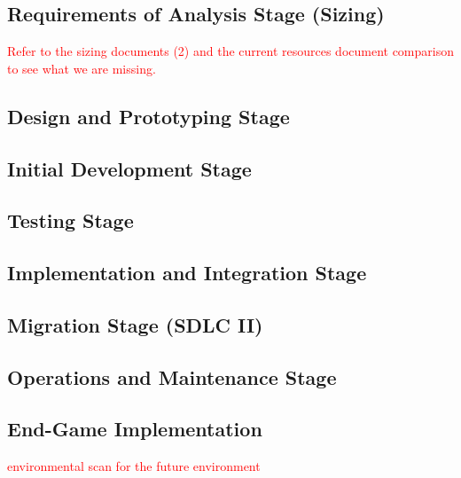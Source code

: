 \subsection{Requirements of Analysis Stage (Sizing)}
\textcolor{red}{Refer to the sizing documents (2) and the current resources document comparison to see what we are missing.}

\subsection{Design and Prototyping Stage}

\subsection{Initial Development Stage}

\subsection{Testing Stage}

\subsection{Implementation and Integration Stage}

\subsection{Migration Stage (SDLC II)}

\subsection{Operations and Maintenance Stage}

\subsection{End-Game Implementation}
\textcolor{red}{environmental scan for the future environment}